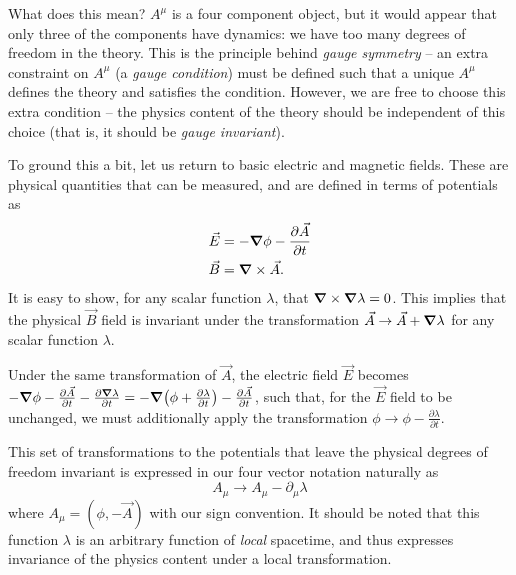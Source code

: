 What does this mean? $A^{\mu}$ is a four component object, but it would appear that only three 
of the components have dynamics: we have too many degrees of freedom in the theory. This is the 
principle behind \emph{gauge symmetry} -- an extra constraint on $A^{\mu}$ (a \emph{gauge condition}) 
must be defined such that a unique $A^{\mu}$ defines the theory and satisfies the condition. However, 
we are free to choose this extra condition -- the physics content of the theory should be independent 
of this choice (that is, it should be \emph{gauge invariant}).

To ground this a bit, let us return to basic electric and magnetic fields. These are physical 
quantities that can be measured, and are defined in terms of potentials as 
\begin{align}
\vec{E} &= -\grad\phi - \frac{\partial \vec{A}}{\partial t}\\
\vec{B} &= \grad \times \vec{A}.
\end{align}
It is easy to show, for any scalar function $\lambda$, that $\grad \times \grad\lambda = 0$. This implies 
that the physical $\vec{B}$ field is invariant under the transformation $\vec{A} \rightarrow \vec{A} + \grad\lambda$
for any scalar function $\lambda$.

Under the same transformation of $\vec{A}$, the electric field $\vec{E}$ becomes $-\grad\phi - \frac{\partial \vec{A}}{\partial t} - \frac{\partial \grad\lambda}{\partial t} = -\grad(\phi + \frac{\partial\lambda}{\partial t}) - \frac{\partial\vec{A}}{\partial t}$, such that, for the $\vec{E}$ field to be unchanged, we must additionally apply the transformation 
$\phi \rightarrow \phi - \frac{\partial\lambda}{\partial t}$.

This set of transformations to the potentials that leave the physical degrees of freedom invariant is expressed 
in our four vector notation naturally as
\begin{equation}
A_{\mu} \rightarrow A_{\mu} - \partial_{\mu}\lambda
\end{equation}
where $A_{\mu} = (\phi, -\vec{A})$ with our sign convention. It should be noted that this 
function $\lambda$ is an arbitrary function of \emph{local} spacetime, and thus expresses 
invariance of the physics content under a local transformation.

